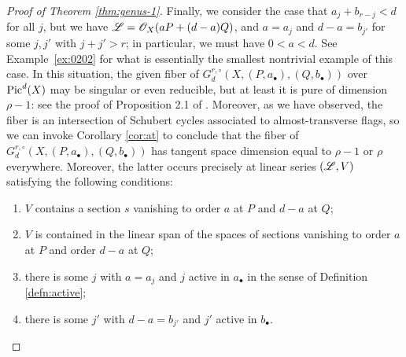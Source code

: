 \documentclass{amsart}
\begin{document}
\begin{proof}[Proof of Theorem \ref{thm:genus-1}]
Finally, we consider the case that $a_j+b_{r-j}<d$ for all $j$, but we
have ${\mathscr L}={\mathscr O}_X(aP+(d-a)Q)$, and $a=a_j$ and $d-a=b_{j'}$ for some $j,j'$ 
with $j+j'>r$; in particular, we must have $0<a<d$. See Example~\ref{ex:0202} for what is essentially the smallest nontrivial example of this case.
In this situation, 
the given fiber of
$G^{r,\circ}_d(X,(P,a_{\bullet}),(Q,b_{\bullet}))$ over $\operatorname{Pic}^d(X)$ may
be singular or even reducible, but at least it is pure of dimension
$\rho-1$: see the proof of Proposition 2.1 of \cite{os26}.
Moreover, as we have observed, the fiber is an intersection
of Schubert cycles associated to almost-transverse flags, so we can
invoke Corollary \ref{cor:at} to conclude that the fiber of
$G^{r,\circ}_d(X,(P,a_{\bullet}),(Q,b_{\bullet}))$ has tangent space
dimension equal to $\rho-1$ or $\rho$ everywhere. Moreover, the latter
occurs precisely at linear series $({\mathscr L},V)$ satisfying the following
conditions: 
\begin{enumerate}
\item $V$ contains
a section $s$ vanishing to order $a$ at $P$ and $d-a$ at $Q$; 
\item $V$ is
contained in the linear span of the spaces of sections vanishing to order $a$ at
$P$ and order $d-a$ at $Q$; 
\item there is some $j$ with $a=a_j$ and $j$ active
in $a_{\bullet}$ in the sense of Definition \ref{defn:active}; 
\item there is some 
$j'$ with $d-a=b_{j'}$ and $j'$ active in $b_{\bullet}$.
\end{enumerate}


\end{proof}
\end{document}
